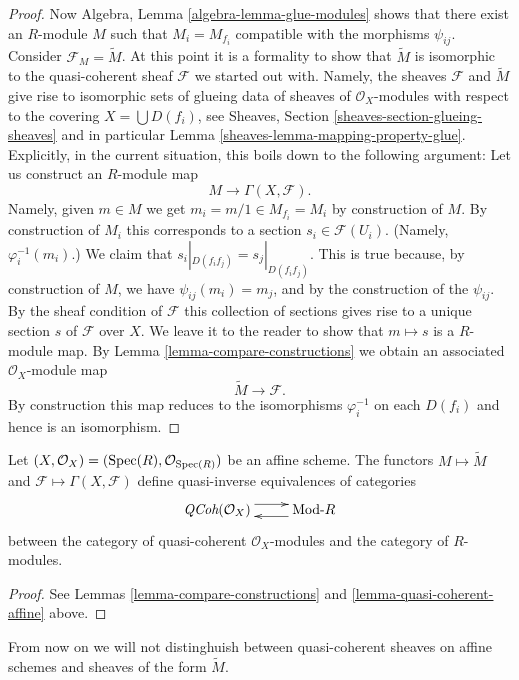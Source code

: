 \begin{proof}
\medskip\noindent
Now Algebra, Lemma \ref{algebra-lemma-glue-modules}
shows that there exist an $R$-module $M$ such that
$M_i = M_{f_i}$ compatible with the morphisms $\psi_{ij}$.
Consider $\mathcal{F}_M = \widetilde M$. At this point it is
a formality to show that $\widetilde M$ is isomorphic to
the quasi-coherent sheaf $\mathcal{F}$ we started out with.
Namely, the sheaves $\mathcal{F}$ and $\widetilde M$ give
rise to isomorphic sets of glueing data of sheaves of $\mathcal{O}_X$-modules
with respect to the covering $X = \bigcup D(f_i)$, see
Sheaves, Section \ref{sheaves-section-glueing-sheaves}
and in particular Lemma \ref{sheaves-lemma-mapping-property-glue}.
Explicitly, in the current situation, this boils down to
the following argument: Let us construct an $R$-module map
$$
M \longrightarrow \Gamma(X, \mathcal{F}).
$$
Namely, given $m \in M$ we get $m_i = m/1 \in M_{f_i} = M_i$
by construction of $M$. By construction of $M_i$ this corresponds
to a section $s_i \in \mathcal{F}(U_i)$. (Namely, $\varphi^{-1}_i(m_i)$.)
We claim that $s_i|_{D(f_if_j)} = s_j|_{D(f_if_j)}$. This is
true because, by construction of $M$, we have $\psi_{ij}(m_i) = m_j$,
and by the construction of the $\psi_{ij}$. By the sheaf condition of
$\mathcal{F}$ this collection of sections gives rise to a unique
section $s$ of $\mathcal{F}$ over $X$. We leave it to the reader
to show that $m \mapsto s$ is a $R$-module map.
By Lemma \ref{lemma-compare-constructions} we obtain an associated
$\mathcal{O}_X$-module map
$$
\widetilde M \longrightarrow \mathcal{F}.
$$
By construction this map reduces to the isomorphisms
$\varphi_i^{-1}$ on each $D(f_i)$ and hence is an isomorphism.
\end{proof}

\begin{lemma}
\label{lemma-equivalence-quasi-coherent}
Let $(X, \mathcal{O}_X) = (\mathop{\rm Spec}(R), \mathcal{O}_{\mathop{\rm Spec}(R)})$
be an affine scheme.
The functors $M \mapsto \widetilde M$ and
$\mathcal{F} \mapsto \Gamma(X, \mathcal{F})$ define quasi-inverse
equivalences of categories
$$
\xymatrix{
\textit{QCoh}(\mathcal{O}_X)
\ar@<1ex>[r]
&
\text{Mod-}R
\ar@<1ex>[l]
}
$$
between the category of quasi-coherent $\mathcal{O}_X$-modules
and the category of $R$-modules.
\end{lemma}

\begin{proof}
See Lemmas \ref{lemma-compare-constructions}
and \ref{lemma-quasi-coherent-affine} above.
\end{proof}

\noindent
From now on we will not distinghuish between quasi-coherent
sheaves on affine schemes and sheaves of the form $\widetilde M$.

